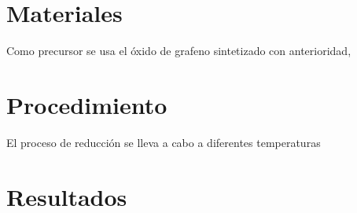 \section{Materiales}
Como precursor se usa el óxido de grafeno sintetizado con anterioridad, 
\section{Procedimiento}
El proceso de reducción se lleva a cabo a diferentes temperaturas
\section{Resultados}
